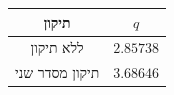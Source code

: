 \begin{tabular}{c c}
תיקון & $q$ \\
\hline
ללא תיקון & $2.85738$ \\
תיקון מסדר שני & $3.68646$ \\
\end{tabular}
